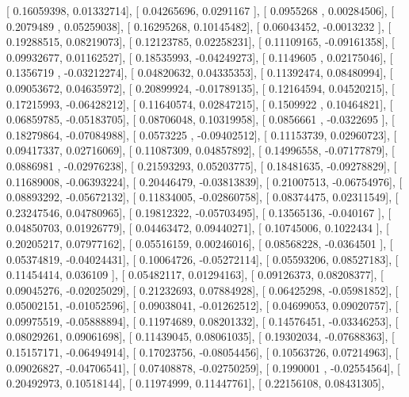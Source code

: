 \documentclass{article}
\begin{document}
       [ 0.16059398,  0.01332714],
       [ 0.04265696,  0.0291167 ],
       [ 0.0955268 ,  0.00284506],
       [ 0.2079489 ,  0.05259038],
       [ 0.16295268,  0.10145482],
       [ 0.06043452, -0.0013232 ],
       [ 0.19288515,  0.08219073],
       [ 0.12123785,  0.02258231],
       [ 0.11109165, -0.09161358],
       [ 0.09932677,  0.01162527],
       [ 0.18535993, -0.04249273],
       [ 0.1149605 ,  0.02175046],
       [ 0.1356719 , -0.03212274],
       [ 0.04820632,  0.04335353],
       [ 0.11392474,  0.08480994],
       [ 0.09053672,  0.04635972],
       [ 0.20899924, -0.01789135],
       [ 0.12164594,  0.04520215],
       [ 0.17215993, -0.06428212],
       [ 0.11640574,  0.02847215],
       [ 0.1509922 ,  0.10464821],
       [ 0.06859785, -0.05183705],
       [ 0.08706048,  0.10319958],
       [ 0.0856661 , -0.0322695 ],
       [ 0.18279864, -0.07084988],
       [ 0.0573225 , -0.09402512],
       [ 0.11153739,  0.02960723],
       [ 0.09417337,  0.02716069],
       [ 0.11087309,  0.04857892],
       [ 0.14996558, -0.07177879],
       [ 0.0886981 , -0.02976238],
       [ 0.21593293,  0.05203775],
       [ 0.18481635, -0.09278829],
       [ 0.11689008, -0.06393224],
       [ 0.20446479, -0.03813839],
       [ 0.21007513, -0.06754976],
       [ 0.08893292, -0.05672132],
       [ 0.11834005, -0.02860758],
       [ 0.08374475,  0.02311549],
       [ 0.23247546,  0.04780965],
       [ 0.19812322, -0.05703495],
       [ 0.13565136, -0.040167  ],
       [ 0.04850703,  0.01926779],
       [ 0.04463472,  0.09440271],
       [ 0.10745006,  0.1022434 ],
       [ 0.20205217,  0.07977162],
       [ 0.05516159,  0.00246016],
       [ 0.08568228, -0.0364501 ],
       [ 0.05374819, -0.04024431],
       [ 0.10064726, -0.05272114],
       [ 0.05593206,  0.08527183],
       [ 0.11454414,  0.036109  ],
       [ 0.05482117,  0.01294163],
       [ 0.09126373,  0.08208377],
       [ 0.09045276, -0.02025029],
       [ 0.21232693,  0.07884928],
       [ 0.06425298, -0.05981852],
       [ 0.05002151, -0.01052596],
       [ 0.09038041, -0.01262512],
       [ 0.04699053,  0.09020757],
       [ 0.09975519, -0.05888894],
       [ 0.11974689,  0.08201332],
       [ 0.14576451, -0.03346253],
       [ 0.08029261,  0.09061698],
       [ 0.11439045,  0.08061035],
       [ 0.19302034, -0.07688363],
       [ 0.15157171, -0.06494914],
       [ 0.17023756, -0.08054456],
       [ 0.10563726,  0.07214963],
       [ 0.09026827, -0.04706541],
       [ 0.07408878, -0.02750259],
       [ 0.1990001 , -0.02554564],
       [ 0.20492973,  0.10518144],
       [ 0.11974999,  0.11447761],
       [ 0.22156108,  0.08431305],
\end{document}
